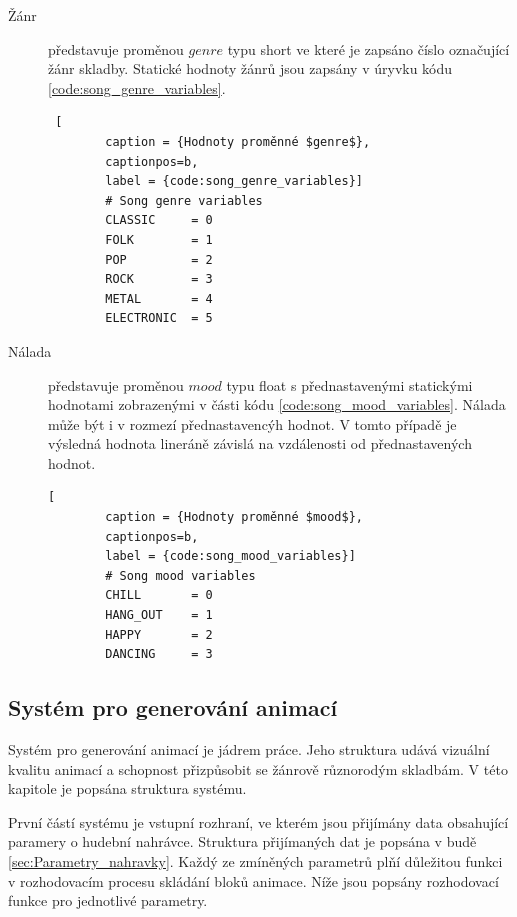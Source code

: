 \begin{description}
    \item[Žánr] představuje proměnou $genre$ typu short ve které je zapsáno číslo označující žánr skladby. Statické hodnoty žánrů jsou zapsány v úryvku kódu \ref{code:song_genre_variables}.
    \begin{lstlisting} [
        caption = {Hodnoty proměnné $genre$},
        captionpos=b,
        label = {code:song_genre_variables}]
        # Song genre variables
        CLASSIC     = 0
        FOLK        = 1
        POP         = 2
        ROCK        = 3
        METAL       = 4
        ELECTRONIC  = 5
    \end{lstlisting}
    \item[Nálada] představuje proměnou $mood$ typu float s přednastavenými statickými hodnotami zobrazenými v části kódu \ref{code:song_mood_variables}. Nálada může být i v rozmezí přednastavencýh hodnot. V tomto případě je výsledná hodnota lineráně závislá na vzdálenosti od přednastavených hodnot. 
    \begin{lstlisting}[
        caption = {Hodnoty proměnné $mood$},
        captionpos=b,
        label = {code:song_mood_variables}]
        # Song mood variables
        CHILL       = 0
        HANG_OUT    = 1
        HAPPY       = 2
        DANCING     = 3
    \end{lstlisting}
    
\end{description}

\subsection{Systém pro generování animací} \label{sec:System_generovani_animaci}

Systém pro generování animací je jádrem práce. Jeho struktura udává vizuální kvalitu animací a schopnost přizpůsobit se žánrově různorodým skladbám. V této kapitole je popsána struktura systému. 

První částí systému je vstupní rozhraní, ve kterém jsou přijímány data obsahující paramery o hudební nahrávce. Struktura přijímaných dat je popsána v budě \ref{sec:Parametry_nahravky}. Každý ze zmíněných parametrů plňí důležitou funkci v rozhodovacím procesu skládání bloků animace. Níže jsou popsány rozhodovací funkce pro jednotlivé parametry.

